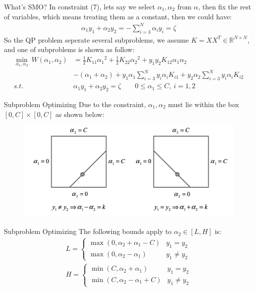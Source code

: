 \documentclass{beamer}
\begin{document}
\begin{frame}{What's SMO?}
    In constraint (7), lets say we select $\alpha_1, \alpha_2$ from $\alpha$, then fix the rest of variables, which means treating them as a constant, then we could have:
    \begin{gather*}
        \alpha_1 y_1 + \alpha_2 y_2 = - \sum_{i=3}^N \alpha_i y_i = \zeta
    \end{gather*}
    So the QP problem seperate several subproblems, we assume $K = X X^T \in \mathbb{R}^{N \times N}$, and one of subproblems is shown as follow:
    \begin{align*}
        \min_{\alpha_1, \alpha_2} \ W(\alpha_1, \alpha_2) &= \frac{1}{2}K_{11} {\alpha_1}^2 + \frac{1}{2} K_{22} {\alpha_2}^2 + y_1 y_2 K_{12} \alpha_1 \alpha_2 \\  &- (\alpha_1 + \alpha_2) + y_1 \alpha_1 \sum_{i=3}^{N}{y_i \alpha_i K_{i1}} + y_2 \alpha_2 \sum_{i=3}^{N}{y_i \alpha_i K_{i2}} \\
        s.t. \ &\alpha_1 y_1 + \alpha_2 y_2 = \zeta \qquad
        0 \leq \alpha_1 \leq C, \ i = 1,2 
    \end{align*}
\end{frame}

\begin{frame}{Subproblem Optimizing}
    Due to the constraint, $\alpha_1, \alpha_2$ must lie within the box $[0, C] \times [0, C]$ as shown below:
    \begin{figure}
    \includegraphics[width=120mm]{alpha.png}
    \end{figure}
\end{frame}

\begin{frame}{Subproblem Optimizing}
    The following bounds apply to $\alpha_2 \in [L, H]$ is:
    \begin{gather*}
        L = 
        \begin{cases}
            \max(0, \alpha_2 + \alpha_1 - C) & y_1 = y_2 \\
            \max(0, \alpha_2 - \alpha_1) & y_1 \neq y_2
        \end{cases}
        \\
        H = \begin{cases}
            \min(C, \alpha_2 + \alpha_1) & y_1 = y_2 \\
            \min(C, \alpha_2 - \alpha_1 + C) & y_1 \neq y_2
        \end{cases}
    \end{gather*}
\end{frame}
\end{document}
